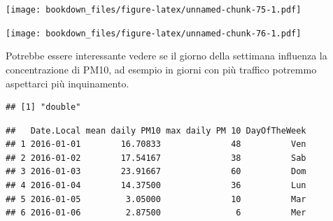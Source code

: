 \documentclass[]{book}
\newenvironment{Shaded}{\begin{snugshade}}{\end{snugshade}}
\newcommand{\CommentTok}[1]{\textcolor[rgb]{0.56,0.35,0.01}{\textit{#1}}}
\newcommand{\DataTypeTok}[1]{\textcolor[rgb]{0.13,0.29,0.53}{#1}}
\newcommand{\DecValTok}[1]{\textcolor[rgb]{0.00,0.00,0.81}{#1}}
\newcommand{\FloatTok}[1]{\textcolor[rgb]{0.00,0.00,0.81}{#1}}
\newcommand{\KeywordTok}[1]{\textcolor[rgb]{0.13,0.29,0.53}{\textbf{#1}}}
\newcommand{\NormalTok}[1]{#1}
\newcommand{\OperatorTok}[1]{\textcolor[rgb]{0.81,0.36,0.00}{\textbf{#1}}}
\newcommand{\OtherTok}[1]{\textcolor[rgb]{0.56,0.35,0.01}{#1}}
\newcommand{\StringTok}[1]{\textcolor[rgb]{0.31,0.60,0.02}{#1}}
\begin{document}
\texttt{[image: bookdown\_files/figure-latex/unnamed-chunk-75-1.pdf]}

\begin{Shaded}
\end{Shaded}

\texttt{[image: bookdown\_files/figure-latex/unnamed-chunk-76-1.pdf]}

Potrebbe essere interessante vedere se il giorno della settimana influenza la concentrazione di PM10, ad esempio in giorni con più traffico potremmo aspettarci più inquinamento.

\begin{Shaded}
\end{Shaded}

\begin{verbatim}
## [1] "double"
\end{verbatim}

\begin{Shaded}
\end{Shaded}

\begin{verbatim}
##   Date.Local mean daily PM10 max daily PM 10 DayOfTheWeek
## 1 2016-01-01        16.70833              48          Ven
## 2 2016-01-02        17.54167              38          Sab
## 3 2016-01-03        23.91667              60          Dom
## 4 2016-01-04        14.37500              36          Lun
## 5 2016-01-05         3.05000              10          Mar
## 6 2016-01-06         2.87500               6          Mer
\end{verbatim}
\end{document}
